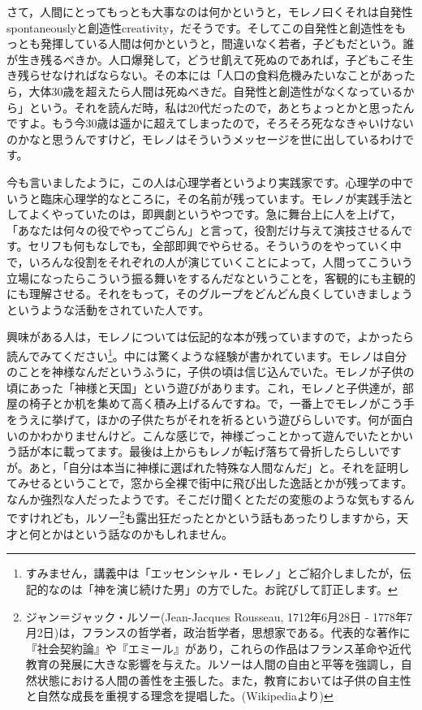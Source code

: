 \documentclass{ltjsbook}
\begin{document}
さて，人間にとってもっとも大事なのは何かというと，モレノ曰くそれは自発性spontaneouslyと創造性creativity，だそうです。そしてこの自発性と創造性をもっとも発揮している人間は何かというと，間違いなく若者，子どもだという。誰が生き残るべきか。人口爆発して，どうせ飢えて死ぬのであれば，子どもこそ生き残らせなければならない。その本には「人口の食料危機みたいなことがあったら，大体30歳を超えたら人間は死ぬべきだ。自発性と創造性がなくなっているから」という。それを読んだ時，私は20代だったので，あとちょっとかと思ったんですよ。もう今30歳は遥かに超えてしまったので，そろそろ死ななきゃいけないのかなと思うんですけど，モレノはそういうメッセージを世に出しているわけです。

今も言いましたように，この人は心理学者というより実践家です。心理学の中でいうと臨床心理学的なところに，その名前が残っています。モレノが実践手法としてよくやっていたのは，即興劇というやつです。急に舞台上に人を上げて，「あなたは何々の役でやってごらん」と言って，役割だけ与えて演技させるんです。セリフも何もなしでも，全部即興でやらせる。そういうのをやっていく中で，いろんな役割をそれぞれの人が演じていくことによって，人間ってこういう立場になったらこういう振る舞いをするんだなということを，客観的にも主観的にも理解させる。それをもって，そのグループをどんどん良くしていきましょうというような活動をされていた人です。

興味がある人は，モレノについては伝記的な本が残っていますので，よかったら読んでみてください\footnote{すみません，講義中は「エッセンシャル・モレノ」\parencite{essentialMoreno}とご紹介しましたが，伝記的なのは「神を演じ続けた男」\parencite{GodOfMoreno}の方でした。お詫びして訂正します。}。中には驚くような経験が書かれています。モレノは自分のことを神様なんだというふうに，子供の頃は信じ込んでいた。モレノが子供の頃にあった「神様と天国」という遊びがあります。これ，モレノと子供達が，部屋の椅子とか机を集めて高く積み上げるんですね。で，一番上でモレノがこう手をうえに挙げて，ほかの子供たちがそれを祈るという遊びらしいです。何が面白いのかわかりませんけど。こんな感じで，神様ごっことかって遊んでいたとかいう話が本に載ってます。最後は上からもレノが転げ落ちて骨折したらしいですが。あと，「自分は本当に神様に選ばれた特殊な人間なんだ」と。それを証明してみせるということで，窓から全裸で街中に飛び出した逸話とかが残ってます。なんか強烈な人だったようです。そこだけ聞くとただの変態のような気もするんですけれども，ルソー\footnote{ジャン＝ジャック・ルソー(Jean-Jacques Rousseau, 1712年6月28日 - 1778年7月2日)は，フランスの哲学者，政治哲学者，思想家である。代表的な著作に『社会契約論』や『エミール』があり，これらの作品はフランス革命や近代教育の発展に大きな影響を与えた。ルソーは人間の自由と平等を強調し，自然状態における人間の善性を主張した。また，教育においては子供の自主性と自然な成長を重視する理念を提唱した。(Wikipediaより)}も露出狂だったとかという話もあったりしますから，天才と何とかはという話なのかもしれません。
\end{document}
